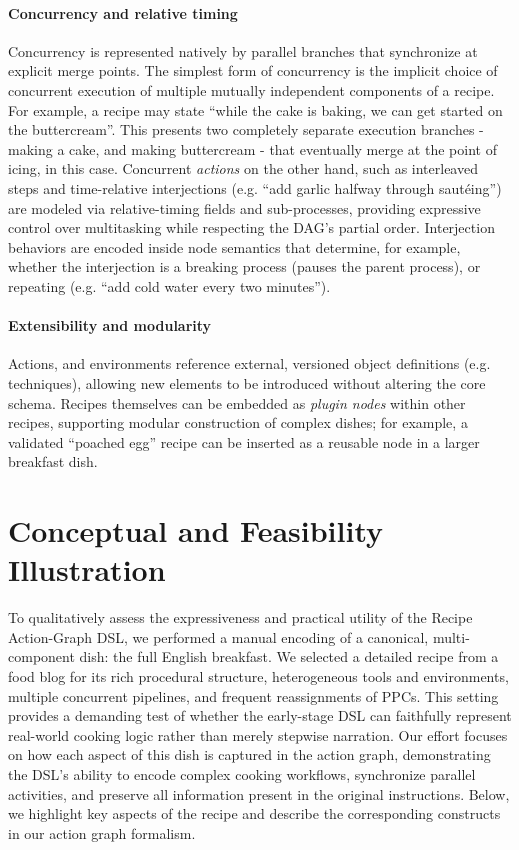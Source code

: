 \documentclass[sigconf]{acmart}
\begin{document}
\paragraph{Concurrency and relative timing} Concurrency is represented natively by parallel branches that synchronize at explicit merge points. The simplest form of concurrency is the implicit choice of concurrent execution of multiple mutually independent components of a recipe. For example, a recipe may state ``while the cake is baking, we can get started on the buttercream''. This presents two completely separate execution branches - making a cake, and making buttercream - that eventually merge at the point of icing, in this case. Concurrent \emph{actions} on the other hand, such as interleaved steps and time-relative interjections (e.g. ``add garlic halfway through sautéing'') are modeled via relative-timing fields and sub-processes, providing expressive control over multitasking while respecting the DAG's partial order. Interjection behaviors are encoded inside node semantics that determine, for example, whether the interjection is a breaking process (pauses the parent process), or repeating (e.g. ``add cold water every two minutes'').   

\paragraph{Extensibility and modularity} Actions, and environments reference external, versioned object definitions (e.g. techniques), allowing new elements to be introduced without altering the core schema. Recipes themselves can be embedded as \emph{plugin nodes} within other recipes, supporting modular construction of complex dishes; for example, a validated ``poached egg'' recipe can be inserted as a reusable node in a larger breakfast dish.

\section{Conceptual and Feasibility Illustration}

To qualitatively assess the expressiveness and practical utility of the Recipe Action-Graph DSL, we performed a manual encoding of a canonical, multi-component dish: the full English breakfast. We selected a detailed recipe from a food blog \cite{le2019englishbreakfast} for its rich procedural structure, heterogeneous tools and environments, multiple concurrent pipelines, and frequent reassignments of PPCs. This setting provides a demanding test of whether the early-stage DSL can faithfully represent real-world cooking logic rather than merely stepwise narration. Our effort focuses on how each aspect of this dish is captured in the action graph, demonstrating the DSL’s ability to encode complex cooking workflows, synchronize parallel activities, and preserve all information present in the original instructions. Below, we highlight key aspects of the recipe and describe the corresponding constructs in our action graph formalism.
\end{document}
